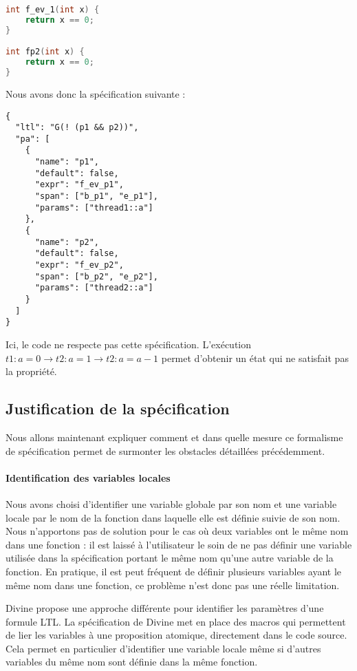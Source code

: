 \begin{lstlisting}[language=C]
int f_ev_1(int x) {
    return x == 0;
}

int fp2(int x) {
    return x == 0;
}
\end{lstlisting}

Nous avons donc la spécification suivante :

\begin{lstlisting}
{
  "ltl": "G(! (p1 && p2))",
  "pa": [
    {
      "name": "p1",
      "default": false,
      "expr": "f_ev_p1",
      "span": ["b_p1", "e_p1"],
      "params": ["thread1::a"]
    },
    {
      "name": "p2",
      "default": false,
      "expr": "f_ev_p2",
      "span": ["b_p2", "e_p2"],
      "params": ["thread2::a"]
    }
  ]
}
\end{lstlisting}

Ici, le code ne respecte pas cette spécification. L'exécution
\(t1: a = 0 \rightarrow t2: a = 1 \rightarrow t2: a = a - 1\) permet
d'obtenir un état qui ne satisfait pas la propriété.

\subsection{Justification de la spécification}

Nous allons maintenant expliquer comment et dans quelle mesure ce formalisme
de spécification permet de surmonter les obstacles détaillées précédemment.

\paragraph{Identification des variables locales}

Nous avons choisi d'identifier une variable globale par son nom et une
variable locale par le nom de la fonction dans laquelle elle est définie
suivie de son nom. Nous n'apportons pas de solution pour le cas où deux
variables ont le même nom dans une fonction : il est laissé à
l'utilisateur le soin de ne pas définir une variable utilisée dans la
spécification portant le même nom qu'une autre variable de la fonction.
En pratique, il est peut fréquent de définir plusieurs variables ayant le
même nom dans une fonction, ce problème n'est donc pas une réelle
limitation.

Divine \cite{Divine_LTL} propose une approche différente pour
identifier les paramètres d'une formule LTL. La spécification de Divine
met en place des macros qui permettent de lier les variables à une
proposition atomique, directement dans le code source. Cela permet en
particulier d'identifier une variable locale même si d'autres variables
du même nom sont définie dans la même fonction.

